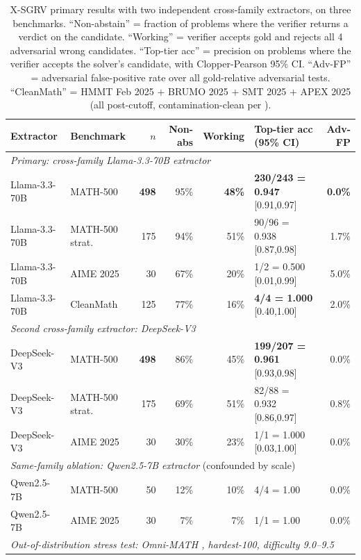 \documentclass{article}
\begin{document}
\begin{table}[t]
\centering
\caption{X-SGRV primary results with two independent cross-family extractors, on three benchmarks. ``Non-abstain'' = fraction of problems where the verifier returns a verdict on the candidate. ``Working'' = verifier accepts gold and rejects all 4 adversarial wrong candidates. ``Top-tier acc'' = precision on problems where the verifier accepts the solver's candidate, with Clopper-Pearson 95\% CI. ``Adv-FP'' = adversarial false-positive rate over all gold-relative adversarial tests. ``CleanMath'' = HMMT Feb 2025 $+$ BRUMO 2025 $+$ SMT 2025 $+$ APEX 2025 (all post-cutoff, contamination-clean per \citet{wu2025contam}).}
\label{tab:xsgrv}
\small
\begin{tabular}{llrrrlr}
\toprule
Extractor & Benchmark & $n$ & Non-abs & Working & Top-tier acc (95\% CI) & Adv-FP \\
\midrule
\multicolumn{7}{l}{\emph{Primary: cross-family Llama-3.3-70B extractor}}\\
Llama-3.3-70B & MATH-500 & \textbf{498} & 95\% & \textbf{48\%} & \textbf{230/243 = 0.947} [0.91,0.97] & \textbf{0.0\%} \\
Llama-3.3-70B & MATH-500 strat. & 175 & 94\% & 51\% & 90/96 = 0.938 [0.87,0.98] & 1.7\% \\
Llama-3.3-70B & AIME 2025 & 30 & 67\% & 20\% & 1/2 = 0.500 [0.01,0.99] & 5.0\% \\
Llama-3.3-70B & CleanMath & 125 & 77\% & 16\% & \textbf{4/4 = 1.000} [0.40,1.00] & 2.0\% \\
\midrule
\multicolumn{7}{l}{\emph{Second cross-family extractor: DeepSeek-V3}}\\
DeepSeek-V3 & MATH-500 & \textbf{498} & 86\% & 45\% & \textbf{199/207 = 0.961} [0.93,0.98] & 0.0\% \\
DeepSeek-V3 & MATH-500 strat. & 175 & 69\% & 51\% & 82/88 = 0.932 [0.86,0.97] & 0.8\% \\
DeepSeek-V3 & AIME 2025 & 30 & 30\% & 23\% & 1/1 = 1.000 [0.03,1.00] & 0.0\% \\
\midrule
\multicolumn{7}{l}{\emph{Same-family ablation: Qwen2.5-7B extractor} (confounded by scale)}\\
Qwen2.5-7B & MATH-500 & 50 & 12\% & 10\% & 4/4 = 1.00 & 0.0\% \\
Qwen2.5-7B & AIME 2025 & 30 & 7\% & 7\% & 1/1 = 1.00 & 0.0\% \\
\midrule
\multicolumn{7}{l}{\emph{Out-of-distribution stress test: Omni-MATH \citep{omnimath2024}, hardest-100, difficulty 9.0--9.5}}\\

\end{tabular}
\end{table}
\end{document}
